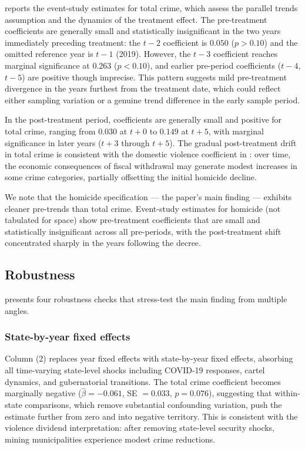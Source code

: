 \documentclass[12pt]{article}
\begin{document}
 reports the event-study estimates for total crime, which assess the parallel trends assumption and the dynamics of the treatment effect. The pre-treatment coefficients are generally small and statistically insignificant in the two years immediately preceding treatment: the $t-2$ coefficient is $0.050$ ($p > 0.10$) and the omitted reference year is $t-1$ (2019). However, the $t-3$ coefficient reaches marginal significance at $0.263$ ($p < 0.10$), and earlier pre-period coefficients ($t-4$, $t-5$) are positive though imprecise. This pattern suggests mild pre-treatment divergence in the years furthest from the treatment date, which could reflect either sampling variation or a genuine trend difference in the early sample period.

In the post-treatment period, coefficients are generally small and positive for total crime, ranging from $0.030$ at $t+0$ to $0.149$ at $t+5$, with marginal significance in later years ($t+3$ through $t+5$). The gradual post-treatment drift in total crime is consistent with the domestic violence coefficient in : over time, the economic consequences of fiscal withdrawal may generate modest increases in some crime categories, partially offsetting the initial homicide decline.

We note that the homicide specification --- the paper's main finding --- exhibits cleaner pre-trends than total crime. Event-study estimates for homicide (not tabulated for space) show pre-treatment coefficients that are small and statistically insignificant across all pre-periods, with the post-treatment shift concentrated sharply in the years following the decree.



\subsection{Robustness}

 presents four robustness checks that stress-test the main finding from multiple angles.

\subsubsection*{State-by-year fixed effects} Column (2) replaces year fixed effects with state-by-year fixed effects, absorbing all time-varying state-level shocks including COVID-19 responses, cartel dynamics, and gubernatorial transitions. The total crime coefficient becomes marginally negative ($\hat{\beta} = -0.061$, SE $= 0.033$, $p = 0.076$), suggesting that within-state comparisons, which remove substantial confounding variation, push the estimate further from zero and into negative territory. This is consistent with the violence dividend interpretation: after removing state-level security shocks, mining municipalities experience modest crime reductions.
\end{document}
